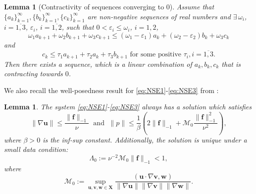 \documentclass[3p]{elsarticle}
\newtheorem{lemma}[theorem]{Lemma}
\def\V#1{\mathbf{#1}}
\newcommand{\Mbd}{\mathcal{M}}
\begin{document}
\begin{lemma}[Contractivity of sequences converging to $0$]\label{ContractivitySequence}
Assume that $\{a_k\}_{k=1}^\infty, \{b_k\}_{k=1}^\infty, \{c_k\}_{k=1}^\infty$ are non-negative sequences of real numbers and $\exists \, \omega_i$, $i=\overline{1,3}$, $\varepsilon_i$, $i=\overline{1,2}$, such that $0<\varepsilon_i \le \omega_i$, $i=1,2$, 
 \begin{equation}
  \omega_1 a_{k+1} + \omega_2 b_{k+1} + \omega_3 c_{k+1} \leq \left(\omega_1-\varepsilon_1 \right) a_k + \left(\omega_2 - \varepsilon_2 \right) b_{k} + \omega_3 c_{k}
  \label{eq:Contract1}
 \end{equation}
 and 
 \begin{equation}
 c_{k} \le \tau_1 a_{k+1} + \tau_2 a_{k} + \tau_3 b_{k+1} \text{ for some positive } \tau_i, i=\overline{1,3}.
 \label{eq:Contract2}
 \end{equation}
Then there exists a sequence, which is a linear combination of $a_{k}, b_{k}, c_{k}$ that is contracting towards $0$.
\end{lemma}
We also recall the well-posedness result for \eqref{eq:NSE1}-\eqref{eq:NSE3} from \cite{Tem2001}:
\begin{lemma}\label{AprioriBds}
The system \eqref{eq:NSE1}-\eqref{eq:NSE3} always has a solution which satisfies
\begin{equation}
    \| \nabla \V{u} \| \le \frac{\|\V{f}\|_{-1}}{\nu} \; \text{ and } \;\| p\| \le \frac{1}{\beta}\left(2\|\V{f}\|_{-1}
    + \Mbd_0 \frac{\|\V{f}\|_{-1}^2}{\nu^2} \right),
\end{equation}
where $\beta>0$ is the inf-sup constant. Additionally, the solution is unique under a small data condition:
\begin{equation}
	\Lambda_0 := \nu^{-2} \Mbd_0 \|\V{f}\|_{-1} < 1 \label{eq:smalldataExact},    
\end{equation}
where 
\begin{equation}
\Mbd_0 := \sup\limits_{\V{u}, \V{v}, \V{w} \in \V{X}} \dfrac{(\V{u} \cdot \nabla \V{v}, \V{w})}{\|\nabla \V{u}\| \|\nabla \V{v}\| \| \nabla \V{w}\|}. \label{eq:mmm}
\end{equation}
\end{lemma}
\end{document}
